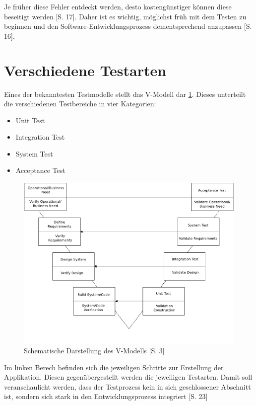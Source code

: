 \documentclass[a4paper,bibtotoc,oneside]{scrbook}
\begin{document}
Je früher diese Fehler entdeckt werden, desto kostengünstiger können diese beseitigt werden \cite{betrieb}[S. 17]. Daher ist es wichtig, möglichst früh mit dem Testen zu beginnen und den Software-Entwicklungsprozess dementsprechend anzupassen \cite{betrieb}[S. 16]. 

\section{Verschiedene Testarten}
Eines der bekanntesten Testmodelle stellt das V-Modell dar \ref{Abb3}. Dieses unterteilt die verschiedenen Testbereiche in vier Kategorien: 

\begin{itemize}
	\item Unit Test
	\item Integration Test
	\item System Test
	\item Acceptance Test
\end{itemize}

\begin{figure}[h!]
\centering
\includegraphics[width=120mm]{img/vmodel.png}
\caption[Schematische Darstellung des V-Modells]{Schematische Darstellung des V-Modells \cite{vmodel}[S. 3]}\label{Abb3}
\end{figure}

Im linken Berech befinden sich die jeweiligen Schritte zur Erstellung der Applikation. Diesen gegenübergestellt werden die jeweiligen Testarten. Damit soll veranschaulicht werden, dass der Testprozess kein in sich geschlossener Abschnitt ist, sondern sich stark in den Entwicklungsprozess integriert \cite{betrieb}[S. 23]
\end{document}
